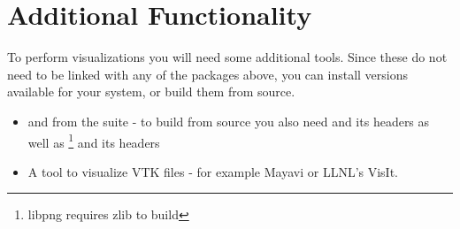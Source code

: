 %
%
%

\section{Additional Functionality}\label{sec:addfunc}
To perform visualizations you will need some additional tools.
Since these do not need to be linked with any of the packages above, you can install versions available for your system, or build them from source.
\begin{itemize}
\item {} and  from the  suite - to build from source you also need  and its headers as well as \footnote{libpng requires zlib to build} and its headers
\item A tool to visualize VTK files - for example Mayavi or LLNL's VisIt.
\end{itemize}

